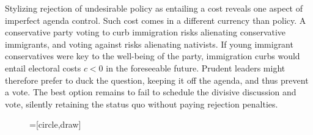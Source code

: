 \documentclass[letter,12pt]{article}
\begin{document}
Stylizing rejection of undesirable policy as entailing a cost reveals one aspect of imperfect agenda control. Such cost comes in a different currency than policy. A conservative party voting to curb immigration risks alienating conservative immigrants, and voting against risks alienating nativists. If young immigrant conservatives were key to the well-being of the party, immigration curbs would entail electoral costs $c<0$ in the foreseeable future. Prudent leaders might therefore prefer to duck the question, keeping it off the agenda, and thus prevent a vote. The best option remains to fail to schedule the divisive discussion and vote, silently retaining the status quo without paying rejection penalties. 

\begin{figure}
  \centering
    =[circle,draw]

\end{figure}
\end{document}
